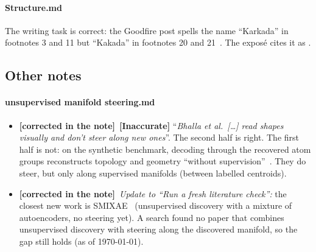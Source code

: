 \documentclass[11pt,a4paper]{article}
\newcommand{\note}[1]{\textsf{#1}}                 %
\newcommand{\sev}[1]{\textbf{[#1]}}                 %
\newcommand{\claim}[1]{\enquote{\textit{#1}}}       %
\newcommand{\fixed}{\textbf{\textcolor{green!50!black}{[corrected in the note]}}} %
\begin{document}
\paragraph{\note{Structure.md}}
The writing task is correct: the Goodfire post spells the name
\enquote{Karkada} in footnotes 3 and 11 but \enquote{Kakada} in footnotes 20
and 21~\cite{goodfire2026world}. The exposé cites it as
\textcite{karkada2026symmetry}.

\subsection{Other notes}

\paragraph{\note{unsupervised manifold steering.md}}
\begin{itemize}
  \item \fixed\ \sev{Inaccurate} \claim{Bhalla et al.\ [\dots] read shapes visually
    and don't steer along new ones}. The second half is right. The first
    half is not: on the synthetic benchmark, decoding through the recovered
    atom groups reconstructs topology and geometry \enquote{without
    supervision}~\cite{bhalla2026saemanifolds}. They do steer, but only
    along supervised manifolds (between labelled centroids).
  \item \fixed\ \textit{Update to \claim{Run a fresh literature check}:} the closest
    new work is SMIXAE~\cite{francel2026smixae} (unsupervised discovery with
    a mixture of autoencoders, no steering yet). A search found no paper that
    combines unsupervised discovery with steering along the discovered
    manifold, so the gap still holds (as of \today).
\end{itemize}
\end{document}
